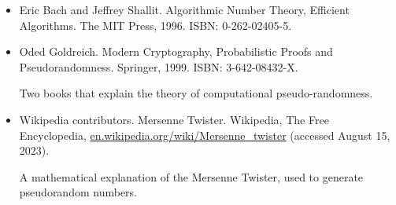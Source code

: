 \begin{itemize}
\item
Eric Bach and Jeffrey Shallit. Algorithmic Number Theory, Efficient Algorithms. The MIT Press, 1996. ISBN: 0-262-02405-5.

\item
Oded Goldreich. Modern Cryptography, Probabilistic Proofs and Pseudorandomness. Springer, 1999. ISBN: 3-642-08432-X.

Two books that explain the theory of computational pseudo-randomness.

\item
Wikipedia contributors. Mersenne Twister. Wikipedia, The Free Encyclopedia, \url{en.wikipedia.org/wiki/Mersenne_twister} (accessed August 15, 2023).

A mathematical explanation of the Mersenne Twister, used to generate pseudorandom numbers.
\end{itemize}